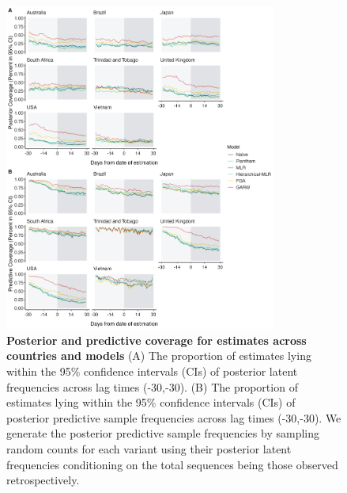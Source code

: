 
\begin{figure}[th!]
	\centering
	\includegraphics[width=0.8\textwidth]{supp_figures/coverage_supp_2.png}
	\caption{
		\textbf{Posterior and predictive coverage for estimates across countries and models}
		(A) The proportion of estimates lying within the 95\% confidence intervals (CIs) of posterior latent frequencies across lag times (-30,-30).
		(B) The proportion of estimates lying within the 95\% confidence intervals (CIs) of posterior predictive sample frequencies across lag times (-30,-30).
		We generate the posterior predictive sample frequencies by sampling random counts for each variant using their posterior latent frequencies conditioning on the total sequences being those observed retrospectively.
	}
	\label{fig:S8}
\end{figure}

